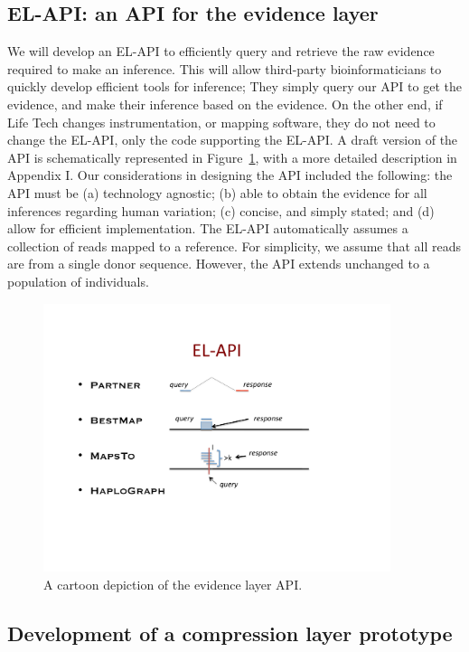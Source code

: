 \documentclass[11pt]{article}
\begin{document}
\subsection{EL-API: an API for the evidence layer}
\label{sec:el_api}
We will develop an EL-API to efficiently query and retrieve the raw
evidence required to make an inference. This will allow third-party
bioinformaticians to quickly develop efficient tools for inference;
They simply query our API to get the evidence, and make their
inference based on the evidence. On the other end, if Life Tech
changes instrumentation, or mapping software, they do not need to
change the EL-API, only the code supporting the EL-API.  A draft
version of the API is schematically represented in
Figure~\ref{fig:el_api}, with a more detailed description in Appendix
I. Our considerations in designing the API included the following: the
API must be (a) technology agnostic; (b) able to obtain the evidence
for all inferences regarding human variation; (c) concise, and simply
stated; and (d) allow for efficient implementation. The EL-API
automatically assumes a collection of reads mapped to a reference. For
simplicity, we assume that all reads are from a single donor
sequence. However, the API extends unchanged to a population of
individuals.
\begin{figure}[ht]
  \centering
  \includegraphics[trim = 25mm 50mm 40mm 20mm, clip, width=4in]{fig/ELAPI.pdf}
  \caption{A cartoon depiction of the evidence layer API.}
  \label{fig:el_api}
\end{figure}

\subsection{Development of a compression layer prototype}
\end{document}
